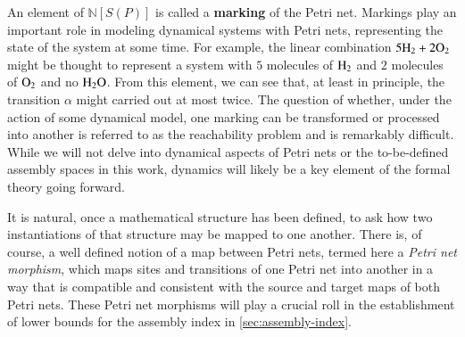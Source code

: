 \documentclass[aps,prd,onecolumn,nofootinbib,letterpaper,preprintnumbers,superscriptaddress,eqsecnum]{revtex4}
\theoremstyle{definition}
\newcommand{\N}{\mathbb{N}}
\begin{document}
\begin{center}
\end{center}

An element of $\N[S(P)]$ is called a \textbf{marking} of the Petri net.
Markings play an important role in modeling dynamical systems with Petri nets, representing the state of the system at some time.
For example, the linear combination $5\ce{H_2} + 2\ce{O_2}$ might be thought to represent a system with $5$ molecules of $\ce{H_2}$ and $2$ molecules of $\ce{O_2}$ and no $\ce{H_2O}$.
From this element, we can see that, at least in principle, the transition $\alpha$ might carried out at most twice.
The question of whether, under the action of some dynamical model, one marking can be transformed or processed into another is referred to as the reachability problem and is remarkably difficult.
While we will not delve into dynamical aspects of Petri nets or the to-be-defined assembly spaces in this work, dynamics will likely be a key element of the formal theory going forward.

It is natural, once a mathematical structure has been defined, to ask how two instantiations of that structure may be mapped to one another.
There is, of course, a well defined notion of a map between Petri nets, termed here a \textit{Petri net morphism}, which maps sites and transitions of one Petri net into another in a way that is compatible and consistent with the source and target maps of both Petri nets.
These Petri net morphisms will play a crucial roll in the establishment of lower bounds for the assembly index in \cref{sec:assembly-index}.
\end{document}
